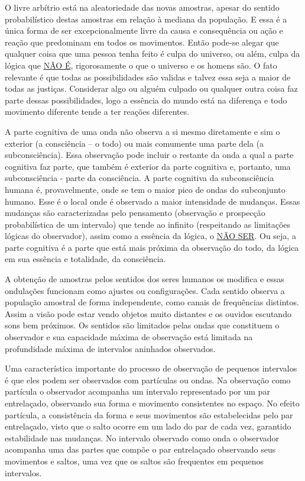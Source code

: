 O livre arbítrio está na aleatoriedade das novas amostras, apesar do sentido probabilístico destas amostras em relação à mediana da população. E essa é a única forma de ser excepcionalmente livre da causa e consequência ou ação e reação que predominam em todos os movimentos. Então pode-se alegar que qualquer coisa que uma pessoa tenha feito é culpa do universo, ou além, culpa da lógica que \underline{NÃO É}, rigorosamente o que o universo e os homens são. O fato relevante é que todas as possibilidades são validas e talvez essa seja a maior de todas as justiças. Considerar algo ou alguém culpado ou qualquer outra coisa faz parte dessas possibilidades, logo a essência do mundo está na diferença e todo movimento diferente tende a ter reações diferentes. 

A parte cognitiva de uma onda não observa a si mesmo diretamente e sim o exterior (a consciência – o todo) ou mais comumente uma parte dela (a subconsciência). Essa observação pode incluir o restante da onda a qual a parte cognitiva faz parte, que também é exterior da parte cognitiva e, portanto, uma subconsciência - parte da consciência. A parte cognitiva da subconsciência humana é, provavelmente, onde se tem o maior pico de ondas do subconjunto humano. Esse é o local onde é observado a maior intensidade de mudanças. Essas mudanças são caracterizadas pelo pensamento (observação e prospecção probabilística de um intervalo) que tende ao infinito (respeitando as limitações lógicas do observador), assim como a essência da lógica, o \underline{NÃO SER}. Ou seja, a parte cognitiva é a parte que está mais próxima da observação do todo, da lógica em sua essência e totalidade, da consciência.

A obtenção de amostras pelos sentidos dos seres humanos os modifica e essas ondulações funcionam como ajustes ou configurações. Cada sentido observa a população amostral de forma independente, como canais de frequências distintos. Assim a visão pode estar vendo objetos muito distantes e os ouvidos escutando sons bem próximos. Os sentidos são limitados pelas ondas que constituem o observador e sua capacidade máxima de observação está limitada na profundidade máxima de intervalos aninhados observados.

Uma característica importante do processo de observação de pequenos intervalos é que eles podem ser observados com partículas ou ondas. Na observação como partícula o observador acompanha um intervalo representado por um par entrelaçado, observando sua forma e movimento consistentes no espaço. No efeito partícula, a consistência da forma e seus movimentos são estabelecidas pelo par entrelaçado, visto que o salto ocorre em um lado do par de cada vez, garantido estabilidade nas mudanças. No intervalo observado como onda o observador acompanha uma das partes que compõe o par entrelaçado observando seus movimentos e saltos, uma vez que os saltos são frequentes em pequenos intervalos.

